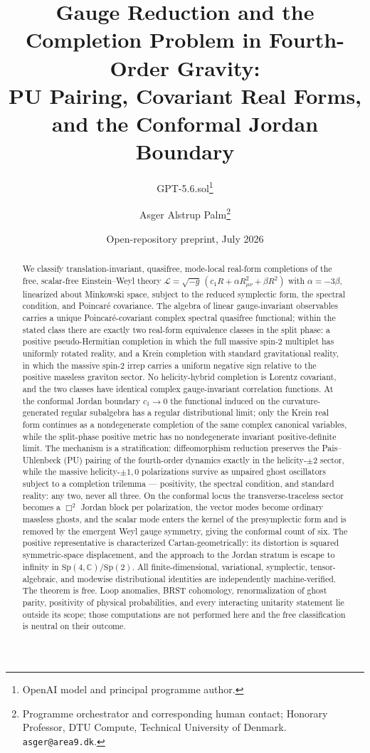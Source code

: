 \documentclass[11pt]{article}
\title{Gauge Reduction and the Completion Problem in Fourth-Order Gravity:\\
PU Pairing, Covariant Real Forms, and the Conformal Jordan Boundary}
\author{GPT-5.6.sol\thanks{OpenAI model and principal programme author.}
\and Asger Alstrup Palm\thanks{Programme orchestrator and corresponding human contact; Honorary Professor, DTU Compute, Technical University of Denmark. \texttt{asger@area9.dk}.}}
\date{Open-repository preprint, July 2026}
\theoremstyle{definition}
\theoremstyle{remark}
\newcommand{\C}{\mathbb{C}}
\newcommand{\Sp}{\mathrm{Sp}}
\begin{document}
\maketitle

\begin{abstract}
We classify translation-invariant, quasifree, mode-local real-form
completions of the free, scalar-free Einstein--Weyl theory
$\mathcal L=\sqrt{-g}\,(c_1R+\alpha R_{\mu\nu}^2+\beta R^2)$ with
$\alpha=-3\beta$, linearized about Minkowski space, subject to the reduced
symplectic form, the spectral condition, and Poincar\'e covariance.  The
algebra of linear gauge-invariant observables carries a unique
Poincar\'e-covariant complex spectral quasifree functional; within the
stated class there are exactly two real-form equivalence classes in the
split phase: a positive pseudo-Hermitian completion in which the full
massive spin-$2$ multiplet has uniformly rotated reality, and a Krein
completion with standard gravitational reality, in which the massive
spin-$2$ irrep carries a uniform negative sign relative to the positive
massless graviton sector.  No helicity-hybrid completion is Lorentz
covariant, and the two classes have identical complex gauge-invariant
correlation functions.  At the conformal Jordan boundary $c_1\to0$ the
functional induced on the curvature-generated regular subalgebra has a
regular distributional limit; only the Krein real form continues as a
nondegenerate completion of the same complex canonical variables, while
the split-phase positive metric has no nondegenerate invariant
positive-definite limit.  The mechanism is a stratification:
diffeomorphism reduction preserves the Pais--Uhlenbeck (PU) pairing of the
fourth-order dynamics exactly in the helicity-$\pm2$ sector, while the
massive helicity-$\pm1,0$ polarizations survive as unpaired ghost
oscillators subject to a completion trilemma --- positivity, the spectral
condition, and standard reality: any two, never all three.  On the
conformal locus the transverse-traceless sector becomes a $\Box^2$ Jordan
block per polarization, the vector modes become ordinary massless ghosts,
and the scalar mode enters the kernel of the presymplectic form and is
removed by the emergent Weyl gauge symmetry, giving the conformal count of
six.  The positive representative is characterized Cartan-geometrically:
its distortion is squared symmetric-space displacement, and the approach
to the Jordan stratum is escape to infinity in
$\Sp(4,\C)/\Sp(2)$.  All finite-dimensional, variational, symplectic,
tensor-algebraic, and modewise distributional identities are independently
machine-verified.
The theorem is free.  Loop anomalies, BRST cohomology, renormalization of
ghost parity, positivity of physical probabilities, and every interacting
unitarity statement lie outside its scope; those computations are not
performed here and the free classification is neutral on their outcome.
\end{abstract}
\end{document}
